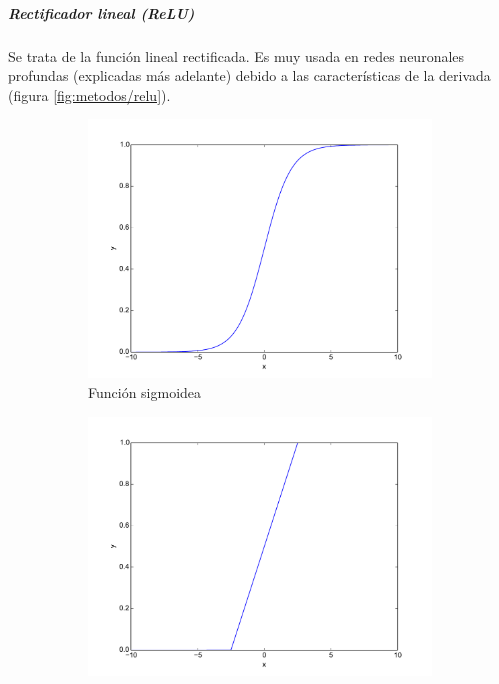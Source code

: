 \subparagraph{Rectificador lineal (ReLU)}
Se trata de la función lineal rectificada. Es muy usada en redes neuronales profundas (explicadas más adelante) debido a las características de la derivada (figura \ref{fig:metodos/relu}).

\begin{figure}[tbh]
	\begin{subfigure}[b]{0.5\textwidth}
		\centering
		\includegraphics[width=\linewidth]{imagenes/metodos/sigmoid.pdf}
		\caption{Función sigmoidea}
		\label{fig:metodos/sigmoid}
	\end{subfigure}
	\begin{subfigure}[b]{0.5\textwidth}
		\centering
		\includegraphics[width=\linewidth]{imagenes/metodos/hard-sigmoid.pdf}

\end{subfigure}
\end{figure}
